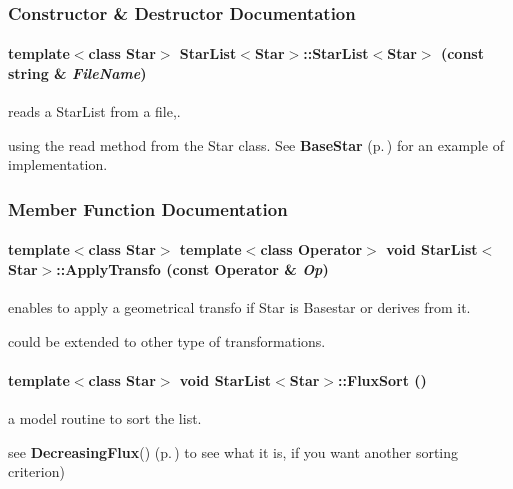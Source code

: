 \subsubsection{Constructor \& Destructor Documentation}
\paragraph{\setlength{\rightskip}{0pt plus 5cm}template$<$class Star$>$ Star\-List$<$Star$>$::Star\-List$<$Star$>$ (const string \& {\em File\-Name})}\hfill\label{class_starlist_a1}


reads a Star\-List from a file,.

using the read method from the Star class.  See {\bf Base\-Star} {\rm (p.\,\pageref{class_basestar})} for an example of implementation. 

\subsubsection{Member Function Documentation}
\paragraph{\setlength{\rightskip}{0pt plus 5cm}template$<$class Star$>$  template$<$class Operator$>$ void Star\-List$<$Star$>$::Apply\-Transfo (const Operator \& {\em Op})\hspace{0.3cm}{\tt  [inline]}}\hfill\label{class_starlist_a15}


enables to apply a geometrical transfo if Star is Basestar or derives from it.

could be extended to other type of transformations. 
\paragraph{\setlength{\rightskip}{0pt plus 5cm}template$<$class Star$>$ void Star\-List$<$Star$>$::Flux\-Sort ()\hspace{0.3cm}{\tt  [inline]}}\hfill\label{class_starlist_a8}


a model routine to sort the list.

see {\bf Decreasing\-Flux}() {\rm (p.\,\pageref{basestar_h_a7})} to see what it is, if you  want another sorting criterion) 
